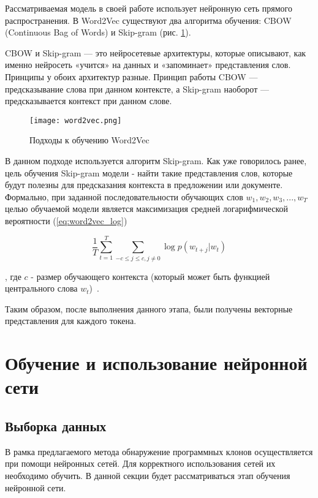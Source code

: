 Рассматриваемая модель в своей работе использует нейронную сеть прямого распространения. В Word2Vec существуют два алгоритма обучения: CBOW (Continuous Bag of Words) и Skip-gram (рис. \ref{fig:word2vec}).


CBOW и Skip-gram — это нейросетевые архитектуры, которые описывают, как именно нейросеть «учится» на данных и «запоминает» представления слов. Принципы у обоих архитектур разные. Принцип работы CBOW — предсказывание слова при данном контексте, а Skip-gram наоборот — предсказывается контекст при данном слове.

\begin{figure}[htbp]
\centering
\texttt{[image: word2vec.png]}
\caption{Подходы к обучению Word2Vec}
\label{fig:word2vec}
\end{figure}

В данном подходе используется алгоритм Skip-gram. Как уже говорилось ранее, цель обучения Skip-gram модели - найти такие представления слов, которые будут полезны для предсказания контекста в предложении или документе. Формально, при заданной последовательности обучающих слов \(w_1, w_2, w_3,...,w_T\) целью обучаемой модели является максимизация средней логарифмической вероятности (\ref{eq:word2vec_log})

\begin{equation}
\label{eq:word2vec_log}
\frac{1}{T}\sum_{t=1}^{T}\sum_{-c \leq j \leq c,j\neq0}\log p(w_{t+j}|w_t)
\end{equation}

, где \(c\) - размер обучающего контекста (который может быть функцией центрального слова \(w_t\))~\cite{word2vec}.

Таким образом, после выполнения данного этапа, были получены векторные представления для каждого токена.
\section{Обучение и использование нейронной сети}

\subsection{Выборка данных}

В рамка предлагаемого метода обнаружение программных клонов осуществляется при помощи нейронных сетей. Для корректного использования сетей их необходимо обучить. В данной секции будет рассматриваться этап обучения нейронной сети.

